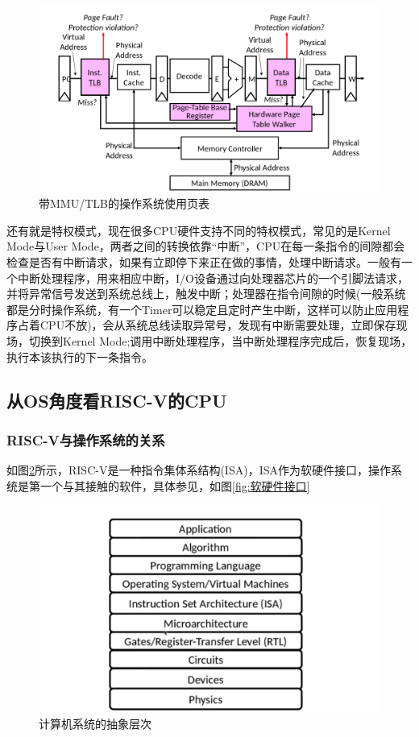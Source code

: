 \begin{figure}[htbp]
  \centering %
  \includegraphics[width=0.9 \textwidth]{figs/OS/MMU_TLB_page.png}
  \caption{带MMU/TLB的操作系统使用页表}
  \label{fig:MMU_TLB_page} %
\end{figure}

还有就是特权模式，现在很多CPU硬件支持不同的特权模式，常见的是Kernel Mode与User Mode，两者之间的转换依靠“中断”，CPU在每一条指令的间隙都会检查是否有中断请求，如果有立即停下来正在做的事情，处理中断请求。一般有一个中断处理程序，用来相应中断，I/O设备通过向处理器芯片的一个引脚法请求，并将异常信号发送到系统总线上，触发中断；处理器在指令间隙的时候(一般系统都是分时操作系统，有一个Timer可以稳定且定时产生中断，这样可以防止应用程序占着CPU不放)，会从系统总线读取异常号，发现有中断需要处理，立即保存现场，切换到Kernel Mode;调用中断处理程序，当中断处理程序完成后，恢复现场，执行本该执行的下一条指令。

\subsection{从OS角度看RISC-V的CPU}
\subsubsection{RISC-V与操作系统的关系}
如图\ref{fig:计算机系统的抽象层次}所示，RISC-V是一种指令集体系结构(ISA)，ISA作为软硬件接口，操作系统是第一个与其接触的软件，具体参见\cite{CS61c}，如图\ref{fig:软硬件接口}

\begin{figure}[htbp]
  \centering %
  \includegraphics[width=0.9 \textwidth]{figs/OS/计算机系统的抽象层次.png}
  \caption{计算机系统的抽象层次}
  \label{fig:计算机系统的抽象层次} %
\end{figure}

